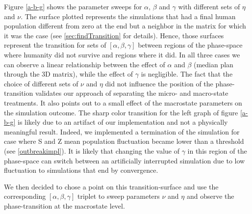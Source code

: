 \documentclass[11pt]{article} %
\begin{document}
Figure \ref{a-b-g} shows the parameter sweeps for $\alpha$, $\beta$ and $\gamma$ with different sets of $\eta$ and $\nu$. The surface plotted represents the simulations that had a final human population different from zero at the end but a neighbor in the matrix for which it was the case (see \ref{sec:findTransition} for details). Hence, those surfaces represent the transition for sets of $[\alpha, \beta, \gamma]$ between regions of the phase-space where humanity did not survive and regions where it did. In all three cases we can observe a linear relationship between the effect of $\alpha$ and $\beta$ (median plan through the 3D matrix), while the effect of $\gamma$ is negligible. The fact that the choice of different sets of $\nu$ and $\eta$ did not influence the position of the phase-transition validates our approach of separating the micro- and macro-state treatments. It also points out to a small effect of the macrostate parameters on the simulation outcome. The sharp color transition for the left graph of figure \ref{a-b-g} is likely due to an artifact of our implementation and not a physically meaningful result. Indeed, we implemented a termination of the simulation for case where S and Z mean population fluctuation became lower than a threshold (see \ref{outbreakimpl}). It is likely that changing the value of $\gamma$ in this region of the phase-space can switch between an artificially interrupted simulation due to low fluctuation to simulations that end by convergence. 

We then decided to chose a point on this transition-surface and use the corresponding $[\alpha, \beta, \gamma]$ triplet to sweep parameters $\nu$ and $\eta$ and observe the phase-transition at the macrostate level.
\end{document}
